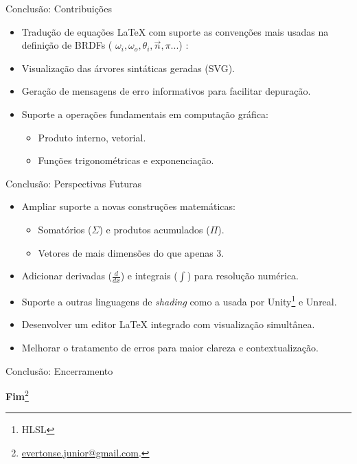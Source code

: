 \begin{frame}{Conclusão: Contribuições}
    \begin{itemize}
        \item Tradução de equações \LaTeX{} com suporte as convenções mais usadas na definição de BRDFs ( $\omega_i,\omega_o, \theta_i, \vec{n}, \pi ...$) :
        \item Visualização das árvores sintáticas geradas (SVG).
        \item Geração de mensagens de erro informativos para facilitar depuração.
        \item Suporte a operações fundamentais em computação gráfica:
        \begin{itemize}
            \item Produto interno, vetorial.
            \item Funções trigonométricas e exponenciação.
        \end{itemize}
    \end{itemize}
\end{frame}

\begin{frame}{Conclusão: Perspectivas Futuras}
    \begin{itemize}
        \item Ampliar suporte a novas construções matemáticas:
        \begin{itemize}
            \item Somatórios ($\Sigma$) e produtos acumulados ($\Pi$).
            \item Vetores de mais dimensões do que apenas 3.
        \end{itemize}
    \item Adicionar derivadas ($\frac{d}{dx}$) e integrais ($\int$) para resolução numérica.
    \item Suporte a outras linguagens de \textit{shading} como a usada por Unity\footnote{HLSL} e Unreal.
    \item Desenvolver um editor \LaTeX{} integrado com visualização simultânea.
    \item Melhorar o tratamento de erros para maior clareza e contextualização.
    \end{itemize}
\end{frame}

\begin{frame}{Conclusão: Encerramento}
    \begin{center}
        \textbf{\Huge Fim}\footnote{\href{mailto:evertonse.junior@gmail.com}{evertonse.junior@gmail.com}.}
    \end{center}
\end{frame}

